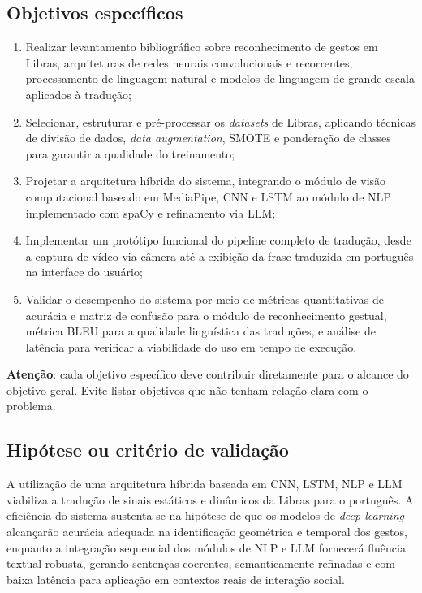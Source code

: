 \documentclass[
    12pt,                %
    openright,           %
    oneside,             %
    a4paper,             %
    english,             %
    brazil               %
]{abntex2}
\begin{document}
\subsection{Objetivos específicos}

\begin{enumerate}
    \item Realizar levantamento bibliográfico sobre reconhecimento de gestos em Libras, arquiteturas de redes neurais convolucionais e recorrentes, processamento de linguagem natural e modelos de linguagem de grande escala aplicados à tradução;
    \item Selecionar, estruturar e pré-processar os \textit{datasets} de Libras, aplicando técnicas de divisão de dados, \textit{data augmentation}, SMOTE e ponderação de classes para garantir a qualidade do treinamento;
    \item Projetar a arquitetura híbrida do sistema, integrando o módulo de visão computacional baseado em MediaPipe, CNN e LSTM ao módulo de NLP implementado com spaCy e refinamento via LLM;
    \item Implementar um protótipo funcional do pipeline completo de tradução, desde a captura de vídeo via câmera até a exibição da frase traduzida em português na interface do usuário;
    \item Validar o desempenho do sistema por meio de métricas quantitativas de acurácia e matriz de confusão para o módulo de reconhecimento gestual, métrica BLEU para a qualidade linguística das traduções, e análise de latência para verificar a viabilidade do uso em tempo de execução.
\end{enumerate}

\textbf{Atenção}: cada objetivo específico deve contribuir diretamente para o alcance do objetivo geral. Evite listar objetivos que não tenham relação clara com o problema.

\subsection{Hipótese ou critério de validação}

A utilização de uma arquitetura híbrida baseada em CNN, LSTM, NLP e LLM viabiliza a tradução de sinais estáticos e dinâmicos da Libras para o português. A eficiência do sistema sustenta-se na hipótese de que os modelos de \textit{deep learning} alcançarão acurácia adequada na identificação geométrica e temporal dos gestos, enquanto a integração sequencial dos módulos de NLP e LLM fornecerá fluência textual robusta, gerando sentenças coerentes, semanticamente refinadas e com baixa latência para aplicação em contextos reais de interação social.
\end{document}
